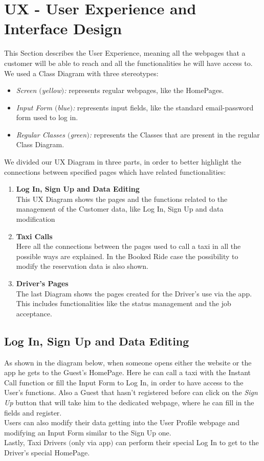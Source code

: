 \section{UX - User Experience and Interface Design}

This Section describes the User Experience, meaning all the webpages that a customer will be able to reach and all the functionalities he will have access to.
\newline
We used a Class Diagram with three stereotypes:
\begin {itemize}
\item \textit{Screen $($yellow$)$:} represents regular webpages, like the HomePages.
\item \textit{Input Form $($blue$)$:} represents input fields, like the standard email-password form used to log in.
\item \textit{Regular Classes $($green$)$:} represents the Classes that are present in the regular Class Diagram.
\end {itemize} 
\hfill
\hfill

We divided our UX Diagram in three parts, in order to better highlight the connections between specified pages which have related functionalities:
\begin{enumerate}
\item \textbf{Log In, Sign Up and Data Editing}\\
	This UX Diagram shows the pages and the functions related to the management of the Customer data, like Log In, Sign Up and data modification
\item \textbf{Taxi Calls}\\
	Here all the connections between the pages used to call a taxi in all the possible ways are explained. 
	In the Booked Ride case the possibility to modify the reservation data is also shown.
\item \textbf{Driver's Pages}\\ 
	The last Diagram shows the pages created for the Driver's use via the app. 
	This includes functionalities like the status management and the job acceptance.
	
\end{enumerate}
\newpage

\subsection{Log In, Sign Up and Data Editing}
As shown in the diagram below, when someone opens either the website or the app he gets to the Guest's HomePage. Here he can call a taxi with the Instant Call function or fill the Input Form to Log In, in order to have access to the User's functions. Also a Guest that hasn't registered before can click on the \textit{Sign Up} button that will take him to the dedicated webpage, where he can fill in the fields and register.\\
Users can also modify their data getting into the User Profile webpage and modifying an Input Form similar to the Sign Up one. \\
Lastly, Taxi Drivers $($only via app$)$ can perform their special Log In to get to the Driver's special HomePage. 

